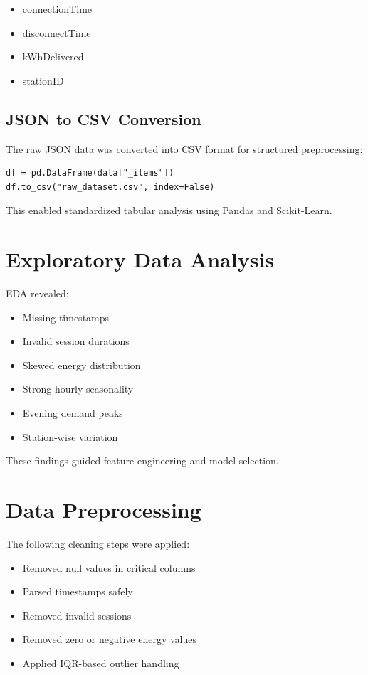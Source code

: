 \documentclass[12pt,a4paper]{article}
\begin{document}
\begin{itemize}
    \item connectionTime
    \item disconnectTime
    \item kWhDelivered
    \item stationID
\end{itemize}

\subsection{JSON to CSV Conversion}

The raw JSON data was converted into CSV format for structured preprocessing:

\begin{verbatim}
df = pd.DataFrame(data["_items"])
df.to_csv("raw_dataset.csv", index=False)
\end{verbatim}

This enabled standardized tabular analysis using Pandas and Scikit-Learn.

\section{Exploratory Data Analysis}

EDA revealed:

\begin{itemize}
    \item Missing timestamps
    \item Invalid session durations
    \item Skewed energy distribution
    \item Strong hourly seasonality
    \item Evening demand peaks
    \item Station-wise variation
\end{itemize}

These findings guided feature engineering and model selection.

\section{Data Preprocessing}

The following cleaning steps were applied:

\begin{itemize}
    \item Removed null values in critical columns
    \item Parsed timestamps safely
    \item Removed invalid sessions
    \item Removed zero or negative energy values
    \item Applied IQR-based outlier handling
\end{itemize}
\end{document}
